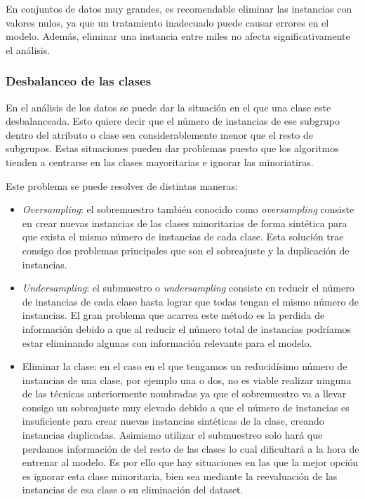 En conjuntos de datos muy grandes, es recomendable eliminar las instancias con valores nulos, ya que un tratamiento inadecuado puede causar errores en el modelo. Además, eliminar una instancia entre miles no afecta significativamente el análisis.

\subsubsection{Desbalanceo de las clases}

En el análisis de los datos se puede dar la situación en el que una clase este desbalanceada. Esto quiere decir que el número de instancias de ese subgrupo dentro del atributo o clase sea considerablemente menor que el resto de subgrupos. Estas situaciones pueden dar problemas puesto que los algoritmos tienden a centrarse en las clases mayoritarias e ignorar las minoriatiras.

Este problema se puede resolver de distintas maneras:
\begin{itemize}
\item \textit{Oversampling}: el sobremuestro también conocido como \textit{oversampling} consiste en crear nuevas instancias de las clases minoritarias de forma sintética para que exista el mismo número de instancias de cada clase. Esta solución trae consigo dos problemas principales que son el sobreajuste y la duplicación de instancias.
\item \textit{Undersampling}: el submuestro o \textit{undersampling} consiste en reducir el número de instancias de cada clase hasta lograr que todas tengan el mismo número de instancias. El gran problema que acarrea este método es la perdida de información debido a que al reducir el número total de instancias podríamos estar eliminando algunas con información relevante para el modelo.
\item Eliminar la clase: en el caso en el que tengamos un reducidísimo número de instancias de una clase, por ejemplo una o dos, no es viable realizar ninguna de las técnicas anteriormente nombradas ya que el sobremuestro va a llevar consigo un sobreajuste muy elevado debido a que el número de instancias es insuficiente para crear nuevas instancias sintéticas de la clase, creando instancias duplicadas. Asimismo utilizar el submuestreo solo hará que perdamos información de del resto de las clases lo cual dificultará a la hora de entrenar al modelo. Es por ello que hay situaciones en las que la mejor opción es ignorar esta clase minoritaria, bien sea mediante la reevaluación de las instancias de esa clase o su eliminación del dataset.
\end{itemize}

